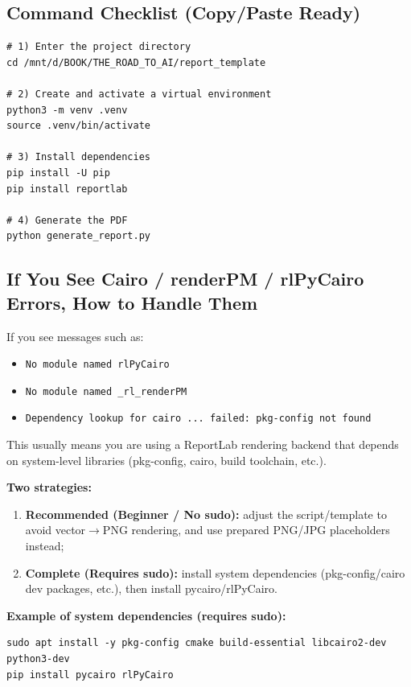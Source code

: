 \documentclass[11pt,a4paper]{article}
\begin{document}
\subsection{Command Checklist (Copy/Paste Ready)}
\begin{lstlisting}
# 1) Enter the project directory
cd /mnt/d/BOOK/THE_ROAD_TO_AI/report_template

# 2) Create and activate a virtual environment
python3 -m venv .venv
source .venv/bin/activate

# 3) Install dependencies
pip install -U pip
pip install reportlab

# 4) Generate the PDF
python generate_report.py
\end{lstlisting}

\subsection{If You See Cairo / renderPM / rlPyCairo Errors, How to Handle Them}
If you see messages such as:
\begin{itemize}[leftmargin=1.5em]
  \item \texttt{No module named rlPyCairo}
  \item \texttt{No module named \_rl\_renderPM}
  \item \texttt{Dependency lookup for cairo ... failed: pkg-config not found}
\end{itemize}
This usually means you are using a ReportLab rendering backend that depends on system-level libraries (pkg-config, cairo, build toolchain, etc.).

\textbf{Two strategies:}
\begin{enumerate}[leftmargin=1.7em]
  \item \textbf{Recommended (Beginner / No sudo):} adjust the script/template to avoid vector$\rightarrow$PNG rendering, and use prepared PNG/JPG placeholders instead;
  \item \textbf{Complete (Requires sudo):} install system dependencies (pkg-config/cairo dev packages, etc.), then install pycairo/rlPyCairo.
\end{enumerate}

\textbf{Example of system dependencies (requires sudo):}
\begin{lstlisting}
sudo apt install -y pkg-config cmake build-essential libcairo2-dev python3-dev
pip install pycairo rlPyCairo
\end{lstlisting}
\end{document}
